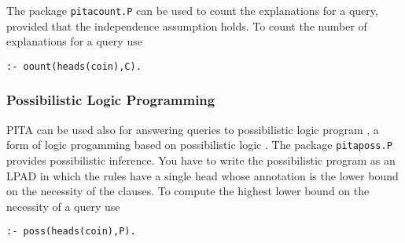 The package \texttt{pitacount.P} can be used to count the explanations for a query, provided that the independence assumption holds. To count the number of explanations for a query use
\begin{verbatim}
:- oount(heads(coin),C).
\end{verbatim}

\subsubsection{Possibilistic Logic Programming}
PITA can be used also for answering queries to possibilistic logic program \cite{DBLP:conf/iclp/DuboisLP91}, a form of logic progamming based on possibilistic logic \cite{DubLanPra-poss-94}. The package \texttt{pitaposs.P} provides possibilistic inference. 
You have to write the possibilistic program as an LPAD in which the rules have a single head whose annotation is the lower bound on the  necessity of the clauses. To compute the highest  lower bound on the necessity of a query
use
\begin{verbatim}
:- poss(heads(coin),P).
\end{verbatim}

